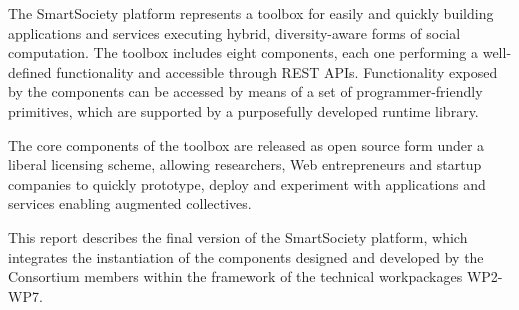 The SmartSociety platform represents a toolbox for easily and quickly building applications and services executing hybrid, diversity-aware forms of social computation. The toolbox includes eight components, each one performing a well-defined functionality and accessible through REST APIs. Functionality exposed by the components can be accessed by means of a set of programmer-friendly primitives, which are supported by a purposefully developed runtime library. 

The core components of the toolbox are released as open source form under a liberal licensing scheme, allowing researchers, Web entrepreneurs and startup companies to quickly prototype, deploy and experiment with applications and services enabling augmented collectives.

This report describes the final version of the SmartSociety platform, which integrates the instantiation of the components designed and developed by the Consortium members within the framework of the technical workpackages WP2-WP7. 



